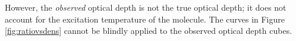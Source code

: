 However, the \emph{observed} optical depth is not the true optical depth; it
does not account for the excitation temperature of the molecule.  The curves in
Figure \ref{fig:ratiovsdens} cannot be blindly applied to the observed optical
depth cubes.

% 
% 
% 
% 


